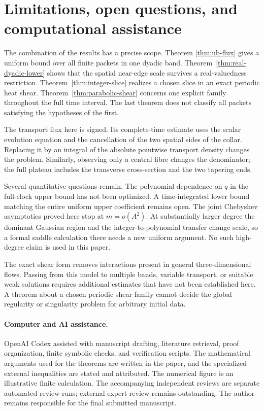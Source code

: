 \section{Limitations, open questions, and computational assistance}
\label{sec:discussion}

The combination of the results has a precise scope. Theorem
\ref{thm:ub-flux} gives a uniform bound over all finite packets in
one dyadic band. Theorem~\ref{thm:real-dyadic-lower} shows that the
spatial near-edge scale survives a real-valuedness restriction.
Theorem~\ref{thm:integer-slice} realizes a chosen slice in an exact
periodic heat shear. Theorem~\ref{thm:parabolic-shear} concerns one
explicit family throughout the full time interval. The last theorem
does not classify all packets satisfying the hypotheses of the first.

The transport flux here is signed. Its complete-time estimate uses
the scalar evolution equation and the cancellation of the two spatial
sides of the collar. Replacing it by an integral of the absolute
pointwise transport density changes the problem. Similarly, observing
only a central fibre changes the denominator; the full plateau
includes the transverse cross-section and the two tapering ends.

Several quantitative questions remain. The polynomial dependence on
\(q\) in the full-clock upper bound has not been optimized. A
time-integrated lower bound matching the entire uniform upper
coefficient remains open. The joint Chebyshev asymptotics proved here
stop at \(m=o(A^2)\). At substantially larger degree the dominant
Gaussian region and the integer-to-polynomial transfer change scale,
so a formal saddle calculation there needs a new uniform argument.
No such high-degree claim is used in this paper.

The exact shear form removes interactions present in general
three-dimensional flows. Passing from this model to multiple bands,
variable transport, or suitable weak solutions requires additional
estimates that have not been established here. A theorem about a
chosen periodic shear family cannot decide the global regularity or
singularity problem for arbitrary initial data.

\paragraph{Computer and AI assistance.}
OpenAI Codex assisted with manuscript drafting, literature retrieval,
proof organization, finite symbolic checks, and verification scripts.
The mathematical arguments used for the theorems are written in the
paper, and the specialized external inequalities are stated and
attributed. The numerical figure is an illustrative finite
calculation. The accompanying independent reviews are separate
automated review runs; external expert review remains outstanding.
The author remains responsible for the final submitted manuscript.

